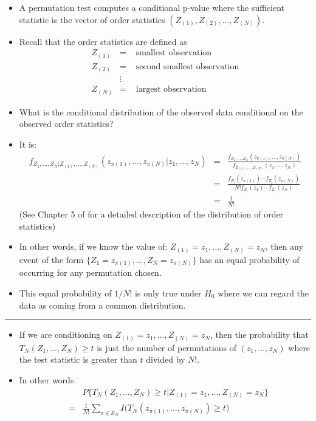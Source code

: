 \documentclass[]{book}
\begin{document}
\begin{itemize}
\item
  A permutation test computes a conditional p-value where the sufficient
  statistic is the vector of order statistics
  \((Z_{(1)}, Z_{(2)}, \ldots,Z_{(N)})\).
\item
  Recall that the order statistics are defined as
  \begin{eqnarray}
  Z_{(1)} &=& \textrm{ smallest observation } \nonumber \\
  Z_{(2)} &=& \textrm{ second smallest observation} \nonumber \\
        & \vdots & \nonumber \\
  Z_{(N)} &=& \textrm{ largest observation} \nonumber
  \end{eqnarray}
\item
  What is the conditional distribution of the observed data
  conditional on the observed order statistics?
\item
  It is:
  \begin{eqnarray}
  f_{Z_{1}, \ldots, Z_{N}|Z_{(1)}, \ldots, Z_{(N)}}( z_{\pi(1)}, \ldots, z_{\pi(N)} | z_{1}, \ldots, z_{N})
  &=& \frac{f_{Z_{1}, \ldots, Z_{N}}( z_{\pi(1)}, \ldots, z_{\pi(N)}   ) }{ f_{Z_{(1)},\ldots,Z_{(N)}}(z_{1}, \ldots, z_{N}) } \nonumber \\
  &=& \frac{f_{Z_{i}}(z_{\pi(1)}) \cdots f_{Z_{i}}(z_{\pi(N)})}{ N!f_{Z_{i}}(z_{1}) \cdots f_{Z_{i}}(z_{N}) } \nonumber \\
  &=& \frac{1}{N!} \nonumber
  \end{eqnarray}
  (See Chapter 5 of \citet{casella2002} for a detailed description of the distribution of order statistics)
\item
  In other words, if we know the value of: \(Z_{(1)}=z_{1}, \ldots, Z_{(N)} = z_{N}\),
  then any event of the form \(\{ Z_{1} = z_{\pi(1)}, \ldots, Z_{N} = z_{\pi(N)} \}\) has an
  equal probability of occurring for any permutation chosen.
\item
  This equal probability of \(1/N!\) is only true under \(H_{0}\) where we can regard the data
  as coming from a common distribution.
\end{itemize}

\begin{center}\rule{0.5\linewidth}{\linethickness}\end{center}

\begin{itemize}
\item
  If we are conditioning on \(Z_{(1)}=z_{1}, \ldots, Z_{(N)} = z_{N}\), then the probability
  that \(T_{N}(Z_{1}, \ldots, Z_{N}) \geq t\) is just the number of permutations of
  \((z_{1}, \ldots, z_{N})\) where the test statistic is greater than \(t\) divided
  by \(N!\).
\item
  In other words
  \begin{eqnarray}
  & & P\Big\{ T_{N}(Z_{1}, \ldots, Z_{N}) \geq t| Z_{(1)} = z_{1}, \ldots, Z_{(N)} = z_{N} \Big\}
   \\
  &=& \frac{1}{N!} \sum_{\pi \in \mathcal{S}_{N}} I\Big( T_{N}(z_{\pi(1)}, \ldots, z_{\pi(N)}) \geq t  \Big)
  \end{eqnarray}
\end{itemize}
\end{document}
